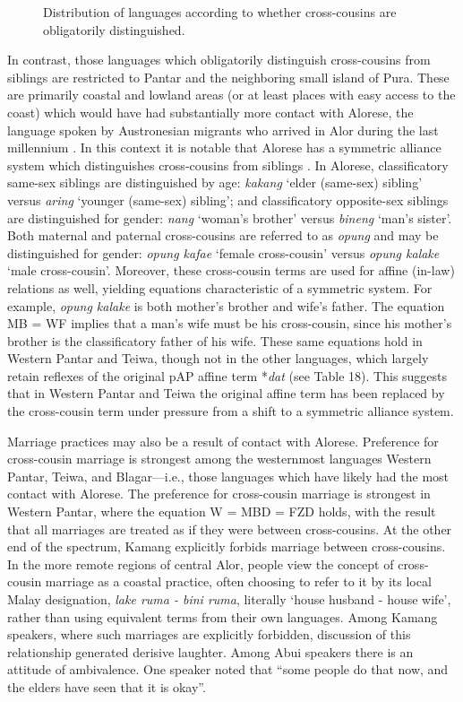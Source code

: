 \begin{figure}
\caption{Distribution of languages according to whether  cross-cousins are obligatorily distinguished.}
\end{figure}


In contrast, those languages which obligatorily distinguish cross-cousins from siblings are restricted to Pantar and the neighboring small island of Pura. These are primarily coastal and lowland areas (or at least places with easy access to the coast) which would have had substantially more contact with Alorese, the language spoken by Austronesian migrants who arrived in Alor during the last millennium \citep{Klamer2011}. In this context it is notable that Alorese has a symmetric alliance system which distinguishes cross-cousins from siblings \citep{Needham1956,Barnes1973}. In Alorese, classificatory same-sex siblings are distinguished by age: \textit{kakang} `elder (same-sex) sibling' versus \textit{aring} `younger (same-sex) sibling'; and classificatory opposite-sex siblings are distinguished for gender: \textit{nang} `woman's brother' versus \textit{bineng} `man's sister'. Both maternal and paternal cross-cousins are referred to as \textit{opung} and may be distinguished for gender: \textit{opung kafae} `female cross-cousin' versus \textit{opung kalake} `male cross-cousin'. Moreover, these cross-cousin terms are used for affine (in-law) relations as well, yielding equations characteristic of a symmetric system. For example, \textit{opung kalake} is both mother's brother and wife's father. The equation MB = WF implies that a man's wife must be his cross-cousin, since his mother's brother is the classificatory father of his wife. These same equations hold in Western Pantar and Teiwa, though not in the other languages, which largely retain reflexes of the original pAP affine term *\textit{dat} (see Table 18). This suggests that in Western Pantar and Teiwa the original affine term has been replaced by the cross-cousin term under pressure from a shift to a symmetric alliance system.

Marriage practices may also be a result of contact with Alorese. Preference for cross-cousin marriage is strongest among the westernmost languages Western Pantar, Teiwa, and Blagar---i.e., those languages which have likely had the most contact with Alorese. The preference for cross-cousin marriage is strongest in Western Pantar, where the equation W = MBD = FZD holds, with the result that all marriages are treated as if they were between cross-cousins. At the other end of the spectrum, Kamang explicitly forbids marriage between cross-cousins. In the more remote regions of central Alor, people view the concept of cross-cousin marriage as a coastal practice, often choosing to refer to it by its local Malay designation, \textit{lake ruma - bini ruma}, literally `house husband - house wife', rather than using equivalent terms from their own languages. Among Kamang speakers, where such marriages are explicitly forbidden, discussion of this relationship generated derisive laughter. Among Abui speakers there is an attitude of ambivalence. One speaker noted that ``some people do that now, and the elders have seen that it is okay''.

